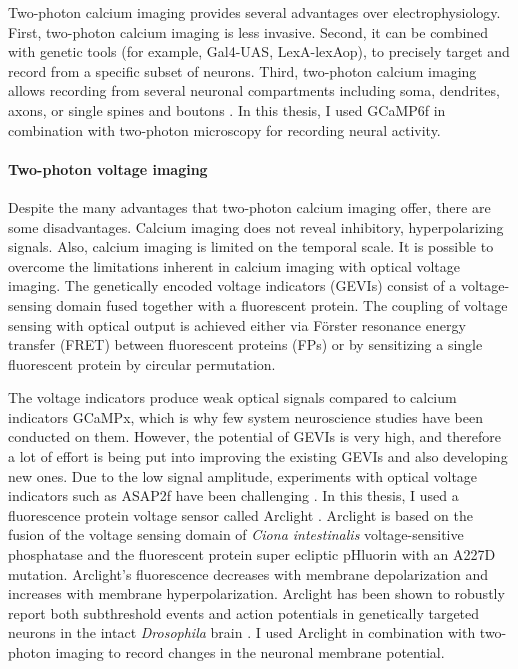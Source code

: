 Two-photon calcium imaging provides several advantages over electrophysiology. First, two-photon calcium imaging is less invasive. Second, it can be combined with genetic tools (for example, Gal4-UAS, LexA-lexAop), to precisely target and record from a specific subset of neurons. Third, two-photon calcium imaging allows recording from several neuronal compartments including soma, dendrites, axons, or single spines and boutons \parencite{Grienberger2022}. In this thesis, I used GCaMP6f  \parencite{Chen2013} in combination with two-photon microscopy for recording neural activity.

\paragraph{Two-photon voltage imaging}
Despite the many advantages that two-photon calcium imaging offer, there are some disadvantages. Calcium imaging does not reveal inhibitory, hyperpolarizing signals. Also, calcium imaging is limited on the temporal scale. It is possible to overcome the limitations inherent in calcium imaging with optical voltage imaging. The genetically encoded voltage indicators (GEVIs) consist of a voltage-sensing domain fused together with a fluorescent protein. The coupling of voltage sensing with optical output is achieved either via Förster resonance energy transfer (FRET) between fluorescent proteins (FPs) or by sensitizing a single fluorescent protein by circular permutation. 

The voltage indicators produce weak optical signals compared to calcium indicators GCaMPx, which is why few system neuroscience studies have been conducted on them. However, the potential of GEVIs is very high, and therefore a lot of effort is being put into improving the existing GEVIs and also developing new ones. Due to the low signal amplitude, experiments with optical voltage indicators such as ASAP2f have been challenging \parencite{Yang2016}. In this thesis, I used a fluorescence protein voltage sensor called Arclight \parencite{Jin2012}. Arclight is based on the fusion of the voltage sensing domain of \textit{Ciona intestinalis} voltage-sensitive phosphatase \parencite{Murata2005} and the fluorescent protein super ecliptic pHluorin with an A227D mutation. Arclight's fluorescence decreases with membrane depolarization and increases with membrane hyperpolarization. Arclight has been shown to robustly report both subthreshold events and action potentials in genetically targeted neurons in the intact \textit{Drosophila} brain \parencite{Cao2013}. I used Arclight in combination with two-photon imaging to record changes in the neuronal membrane potential.

